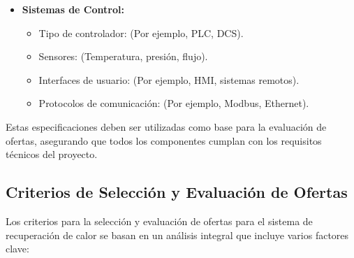 \documentclass[11pt,a4paper]{article}  %
\begin{document}
\begin{itemize}
    \item \textbf{Sistemas de Control:}
    \begin{itemize}
        \item Tipo de controlador: (Por ejemplo, PLC, DCS).
        \item Sensores: (Temperatura, presión, flujo).
        \item Interfaces de usuario: (Por ejemplo, HMI, sistemas remotos).
        \item Protocolos de comunicación: (Por ejemplo, Modbus, Ethernet).
    \end{itemize}
\end{itemize}

Estas especificaciones deben ser utilizadas como base para la evaluación de ofertas, asegurando que todos los componentes cumplan con los requisitos técnicos del proyecto.


\subsection{Criterios de Selección y Evaluación de Ofertas}
Los criterios para la selección y evaluación de ofertas para el sistema de recuperación de calor se basan en un análisis integral que incluye varios factores clave:
\end{document}
